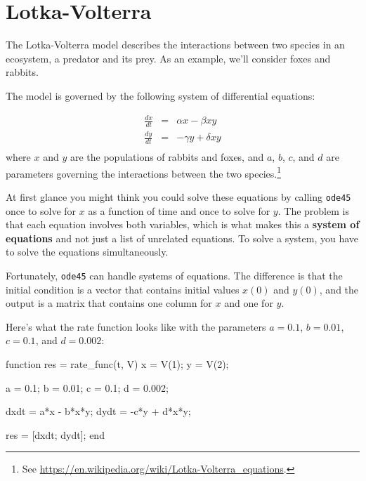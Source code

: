 \section{Lotka-Volterra}
\label{lotka}

The Lotka-Volterra model describes the interactions between two
species in an ecosystem, a predator and its prey.  As an example, we'll consider foxes and rabbits.


The model is governed by the following system of differential equations:

\begin{eqnarray}
    \frac{dx}{dt} &=& \alpha x - \beta x y         \\
    \frac{dy}{dt} &=& -\gamma y + \delta x y       \\
\end{eqnarray}
%
where $x$ and $y$ are the populations of rabbits and foxes,
and $a$, $b$, $c$, and $d$ are parameters
governing the interactions between the two species.\footnote{See
\url{https://en.wikipedia.org/wiki/Lotka-Volterra_equations}.}

At first glance you might think you could solve these equations by
calling {\tt ode45} once to solve for $x$ as a function of time and
once to solve for $y$.  The problem is that each equation involves
both variables, which is what makes this a {\bf system of equations}
and not just a list of unrelated equations.  To solve a system, you
have to solve the equations simultaneously.


Fortunately, {\tt ode45} can handle systems of equations.  The
difference is that the initial condition is a vector that contains
initial values $x(0)$ and $y(0)$, and the output is a matrix
that contains one column for $x$ and one for $y$.


Here's what the rate function looks like
with the parameters $a = 0.1$, $b = 0.01$, $c = 0.1$, 
and $d = 0.002$:

\begin{code}
function res = rate_func(t, V)
    x = V(1);
    y = V(2);

    a = 0.1;
    b = 0.01;
    c = 0.1;
    d = 0.002;

    dxdt = a*x - b*x*y;
    dydt = -c*y + d*x*y;

    res = [dxdt; dydt];
end
\end{code}

